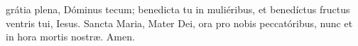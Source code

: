 grátia plena, Dóminus tecum; benedicta tu in muliéribus, et benedíctus fructus ventris tui,
Iesus. Sancta Maria, Mater Dei, ora pro nobis peccatóribus, nunc et in hora mortis nostr{\ae}. Amen.